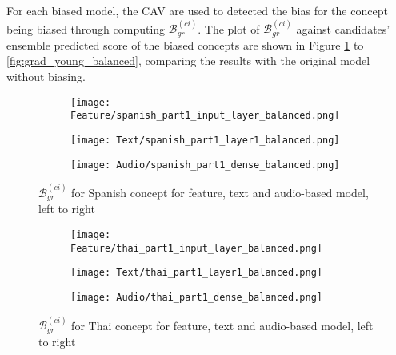 For each biased model, the CAV are used to detected the bias for the concept being biased through computing $\mathcal{B}^{(ci)}_{gr}$. The plot of $\mathcal{B}^{(ci)}_{gr}$ against candidates’ ensemble predicted score of the biased concepts are shown in Figure \ref{fig:grad_spanish_balanced} to \ref{fig:grad_young_balanced}, comparing the results with the original model without biasing.
\begin{figure}[H]
    \centering
    \begin{subfigure}{0.32\textwidth}
        \centering
        \texttt{[image: Feature/spanish\_part1\_input\_layer\_balanced.png]}
    \end{subfigure}
    \hfill
    \begin{subfigure}{0.32\textwidth}
        \centering
        \texttt{[image: Text/spanish\_part1\_layer1\_balanced.png]}
    \end{subfigure}
    \hfill
    \begin{subfigure}{0.32\textwidth}
        \centering
        \texttt{[image: Audio/spanish\_part1\_dense\_balanced.png]}
    \end{subfigure}
    \caption{$\mathcal{B}^{(ci)}_{gr}$ for Spanish concept for feature, text and audio-based model, left to right}
    \label{fig:grad_spanish_balanced}
\end{figure}

\begin{figure}[H]
    \centering
    \begin{subfigure}{0.32\textwidth}
        \centering
        \texttt{[image: Feature/thai\_part1\_input\_layer\_balanced.png]}
    \end{subfigure}
    \hfill
    \begin{subfigure}{0.32\textwidth}
        \centering
        \texttt{[image: Text/thai\_part1\_layer1\_balanced.png]}
    \end{subfigure}
    \hfill
    \begin{subfigure}{0.32\textwidth}
        \centering
        \texttt{[image: Audio/thai\_part1\_dense\_balanced.png]}
    \end{subfigure}
    \caption{$\mathcal{B}^{(ci)}_{gr}$ for Thai concept for feature, text and audio-based model, left to right}
    \label{fig:grad_thai_balanced}
\end{figure}


